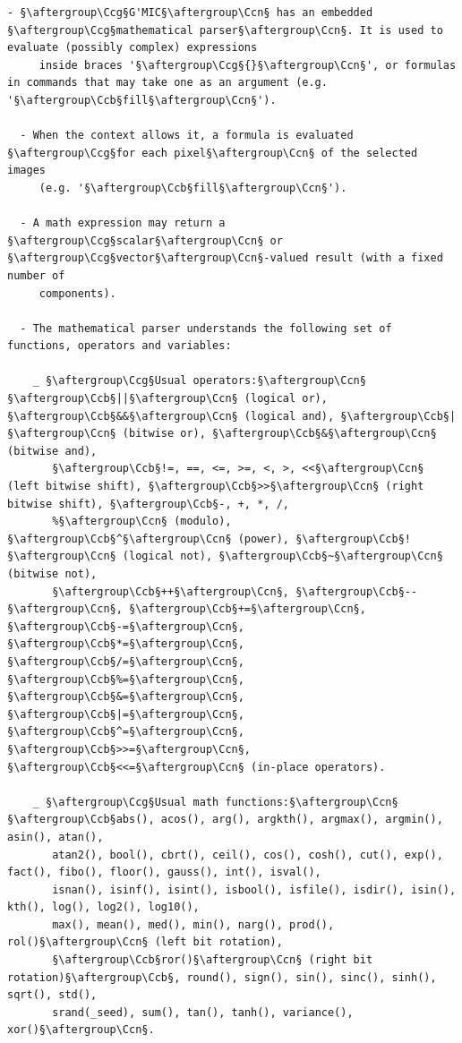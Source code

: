 \documentclass[a4paper,10.5pt,twoside]{book}
\def\Ccb{\color{cb}}
\def\Ccg{\color{cc}}
\def\Ccn{\color{black}}
\begin{document}
\begin{lstlisting}[escapechar=§]
  - §\aftergroup\Ccg§G'MIC§\aftergroup\Ccn§ has an embedded §\aftergroup\Ccg§mathematical parser§\aftergroup\Ccn§. It is used to evaluate (possibly complex) expressions 
     inside braces '§\aftergroup\Ccg§{}§\aftergroup\Ccn§', or formulas in commands that may take one as an argument (e.g. '§\aftergroup\Ccb§fill§\aftergroup\Ccn§'). 
 
  - When the context allows it, a formula is evaluated §\aftergroup\Ccg§for each pixel§\aftergroup\Ccn§ of the selected images 
     (e.g. '§\aftergroup\Ccb§fill§\aftergroup\Ccn§'). 
 
  - A math expression may return a §\aftergroup\Ccg§scalar§\aftergroup\Ccn§ or §\aftergroup\Ccg§vector§\aftergroup\Ccn§-valued result (with a fixed number of 
     components). 
 
  - The mathematical parser understands the following set of functions, operators and variables: 
 
    _ §\aftergroup\Ccg§Usual operators:§\aftergroup\Ccn§ §\aftergroup\Ccb§||§\aftergroup\Ccn§ (logical or), §\aftergroup\Ccb§&&§\aftergroup\Ccn§ (logical and), §\aftergroup\Ccb§|§\aftergroup\Ccn§ (bitwise or), §\aftergroup\Ccb§&§\aftergroup\Ccn§ (bitwise and), 
       §\aftergroup\Ccb§!=, ==, <=, >=, <, >, <<§\aftergroup\Ccn§ (left bitwise shift), §\aftergroup\Ccb§>>§\aftergroup\Ccn§ (right bitwise shift), §\aftergroup\Ccb§-, +, *, /, 
       %§\aftergroup\Ccn§ (modulo), §\aftergroup\Ccb§^§\aftergroup\Ccn§ (power), §\aftergroup\Ccb§!§\aftergroup\Ccn§ (logical not), §\aftergroup\Ccb§~§\aftergroup\Ccn§ (bitwise not), 
       §\aftergroup\Ccb§++§\aftergroup\Ccn§, §\aftergroup\Ccb§--§\aftergroup\Ccn§, §\aftergroup\Ccb§+=§\aftergroup\Ccn§, §\aftergroup\Ccb§-=§\aftergroup\Ccn§, §\aftergroup\Ccb§*=§\aftergroup\Ccn§, §\aftergroup\Ccb§/=§\aftergroup\Ccn§, §\aftergroup\Ccb§%=§\aftergroup\Ccn§, §\aftergroup\Ccb§&=§\aftergroup\Ccn§, §\aftergroup\Ccb§|=§\aftergroup\Ccn§, §\aftergroup\Ccb§^=§\aftergroup\Ccn§, §\aftergroup\Ccb§>>=§\aftergroup\Ccn§, §\aftergroup\Ccb§<<=§\aftergroup\Ccn§ (in-place operators). 
 
    _ §\aftergroup\Ccg§Usual math functions:§\aftergroup\Ccn§ §\aftergroup\Ccb§abs(), acos(), arg(), argkth(), argmax(), argmin(), asin(), atan(), 
       atan2(), bool(), cbrt(), ceil(), cos(), cosh(), cut(), exp(), fact(), fibo(), floor(), gauss(), int(), isval(), 
       isnan(), isinf(), isint(), isbool(), isfile(), isdir(), isin(), kth(), log(), log2(), log10(), 
       max(), mean(), med(), min(), narg(), prod(), rol()§\aftergroup\Ccn§ (left bit rotation), 
       §\aftergroup\Ccb§ror()§\aftergroup\Ccn§ (right bit rotation)§\aftergroup\Ccb§, round(), sign(), sin(), sinc(), sinh(), sqrt(), std(), 
       srand(_seed), sum(), tan(), tanh(), variance(), xor()§\aftergroup\Ccn§. 
 

\end{lstlisting}
\end{document}
